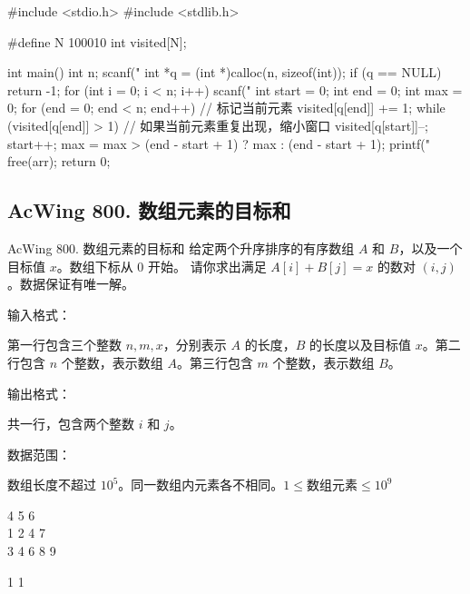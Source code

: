 \begin{mycpptwocol}[最长连续不重复子序列]
    #include <stdio.h>
    #include <stdlib.h>

    #define N 100010
    int visited[N];

    int main()
        {
        int n;
        scanf("%
        int *q = (int *)calloc(n, sizeof(int));
        if (q == NULL) {
            return -1;
        }
        for (int i = 0; i < n; i++) {
            scanf("%
        }
        int start = 0;
        int end = 0;
        int max = 0;
        for (end = 0; end < n; end++) {
            // 标记当前元素
            visited[q[end]] += 1;
            while (visited[q[end]] > 1) {
                // 如果当前元素重复出现，缩小窗口
                visited[q[start]]--;
                start++;
            }
            max = max > (end - start + 1) ? max : (end - start + 1);
        }
        printf("%
        free(arr);
        return 0;
    }
\end{mycpptwocol}

\subsection{AcWing 800. 数组元素的目标和}
\begin{titledbox}{AcWing 800. 数组元素的目标和}
    给定两个升序排序的有序数组 $A$ 和 $B$，以及一个目标值 $x$。数组下标从 $0$ 开始。
    请你求出满足 $A[i] + B[j] = x$ 的数对 $(i, j)$。数据保证有唯一解。

    输入格式：

    第一行包含三个整数 $n,m,x$，分别表示 $A$ 的长度，$B$ 的长度以及目标值 $x$。第二行包含 $n$ 个整数，表示数组 $A$。第三行包含 $m$ 个整数，表示数组 $B$。

    输出格式：

    共一行，包含两个整数 $i$ 和 $j$。

    数据范围：

    数组长度不超过 $10^5$。同一数组内元素各不相同。$1 \le \text{数组元素} \le 10^9$

    \begin{inputblock}
        4 5 6 \\
        1 2 4 7 \\
        3 4 6 8 9
    \end{inputblock}
    \begin{outputblock}
        1 1
    \end{outputblock}
\end{titledbox}

